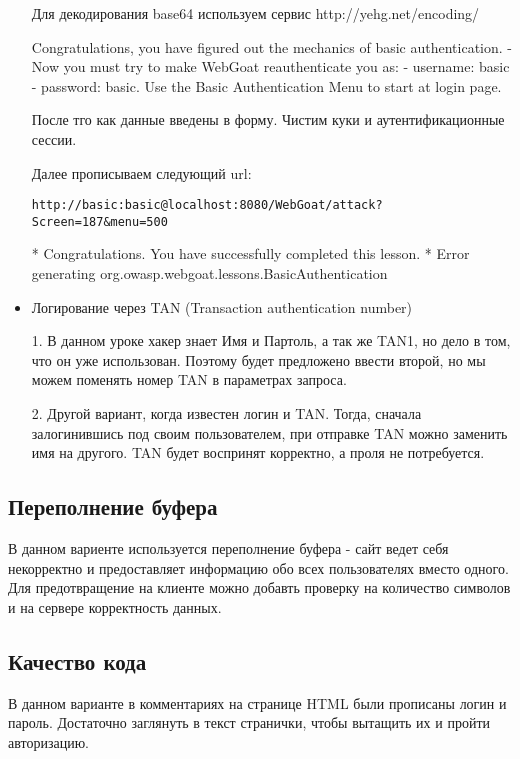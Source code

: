 \documentclass[11pt, a4paper]{article}		%
\begin{document}
\begin{itemize}
Для декодирования base64 используем сервис http://yehg.net/encoding/

Congratulations, you have figured out the mechanics of basic authentication.  
- Now you must try to make WebGoat reauthenticate you as:
- username: basic     
- password: basic. 
Use the Basic Authentication Menu to start at login page.
 
После тго как данные введены в форму. Чистим куки и аутентификационные сессии.

Далее прописываем следующий url: 

\verb'http://basic:basic@localhost:8080/WebGoat/attack?Screen=187&menu=500'
 
* Congratulations. You have successfully completed this lesson.
* Error generating org.owasp.webgoat.lessons.BasicAuthentication


\item Логирование через TAN (Transaction authentication number)

1. В данном уроке хакер знает Имя и Партоль, а так же TAN1, но дело в том, что он уже использован. Поэтому будет предложено ввести второй, но мы можем поменять номер TAN в параметрах запроса.

2. Другой вариант, когда известен логин и TAN. Тогда, сначала залогинившись под своим пользователем, при отправке TAN можно заменить имя на другого. TAN будет воспринят корректно, а проля не потребуется.

\end{itemize}



\subsection{Переполнение буфера}

В данном вариенте используется переполнение буфера - сайт ведет себя некорректно и предоставляет информацию обо всех пользователях вместо одного. 
Для предотвращение на клиенте можно добавть проверку на количество символов и на сервере корректность данных.


\subsection{Качество кода}

В данном варианте в комментариях на странице HTML были прописаны логин и пароль. Достаточно заглянуть в текст странички, чтобы вытащить их и пройти авторизацию.
\end{document}
